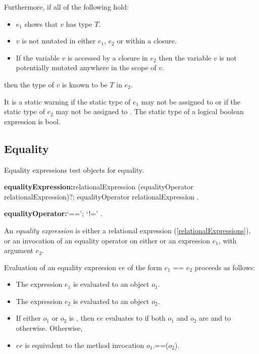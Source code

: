 \documentclass{article}
\newcommand{\code}[1]{{\sf #1}}
\begin{document}
\LMHash{}
Furthermore, if all of the following hold:
\begin{itemize}
\item $e_1$ shows that $v$ has type $T$.
\item $v$ is not mutated in either $e_1$, $e_2$ or within a closure.
\item If the variable $v$ is accessed by a closure in $e_2$ then the variable $v$ is not potentially mutated anywhere in the scope of $v$. 
\end{itemize}
then the type of $v$ is known to be $T$ in $e_2$.

\LMHash{}
It is a static warning if the static type of $e_1$ may not be assigned to  or if the static type of $e_2$ may not be assigned to . The static type of a logical boolean expression is \code{bool}.

     
 \subsection{ Equality}
 
\LMHash{}
Equality expressions test objects for equality.

 \begin{grammar}
{\bf equalityExpression:}relationalExpression (equalityOperator relationalExpression)?;
      \SUPER{} equalityOperator relationalExpression
    .

{\bf equalityOperator:}`==';
      `!='
    .
 \end{grammar}
 
\LMHash{}
An {\em equality expression} is either a relational expression (\ref{relationalExpressions}), or an invocation of an equality operator on either \SUPER{} or an expression $e_1$, with argument $e_2$.


\LMHash{}
Evaluation of an equality expression $ee$ of the form \code{$e_1$ == $e_2$} proceeds as follows:
\begin{itemize}
\item The expression $e_1$ is evaluated to an object $o_1$.
\item The expression $e_2$ is evaluated to an object $o_2$.
\item If either $o_1$ or $o_2$ is \NULL{}, then $ee$ evaluates to \TRUE{} if both $o_1$ and $o_2$ are \NULL{} and to \FALSE{} otherwise.  Otherwise,
\item $ee$ is equivalent to the method invocation \code{$o_1$.==($o_2$)}.
\end{itemize}
\end{document}

